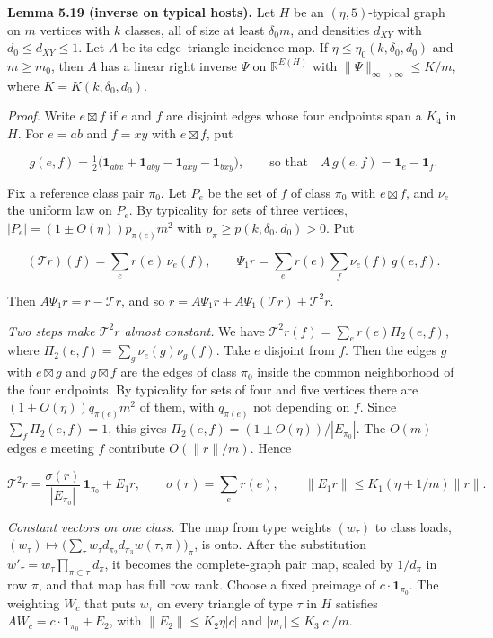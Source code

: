 \documentclass[english,11pt,a4paper]{article}
\begin{document}
\textbf{Lemma 5.19 (inverse on typical hosts).} Let \(H\) be an \((\eta,5)\)-typical graph on \(m\) vertices with \(k\) classes, all of size at least \(\delta_0m\), and densities \(d_{XY}\) with \(d_0\le d_{XY}\le1\). Let \(A\) be its edge--triangle incidence map. If \(\eta\le\eta_0(k,\delta_0,d_0)\) and \(m\ge m_0\), then \(A\) has a linear right inverse \(\Psi\) on \(\mathbb R^{E(H)}\) with \(\|\Psi\|_{\infty\to\infty}\le K/m\), where \(K=K(k,\delta_0,d_0)\).

\emph{Proof.} Write \(e\boxtimes f\) if \(e\) and \(f\) are disjoint edges whose four endpoints span a \(K_4\) in \(H\). For \(e=ab\) and \(f=xy\) with \(e\boxtimes f\), put

\nopagebreak[4]
\[g(e,f)=\tfrac12\bigl(\mathbf 1_{abx}+\mathbf 1_{aby}-\mathbf 1_{axy}-\mathbf 1_{bxy}\bigr),\qquad\text{so that}\quad A\,g(e,f)=\mathbf 1_e-\mathbf 1_f.\]

Fix a reference class pair \(\pi_0\). Let \(P_e\) be the set of \(f\) of class \(\pi_0\) with \(e\boxtimes f\), and \(\nu_e\) the uniform law on \(P_e\). By typicality for sets of three vertices, \(|P_e|=(1\pm O(\eta))p_{\pi(e)}m^2\) with \(p_\pi\ge p(k,\delta_0,d_0)>0\). Put

\nopagebreak[4]
\[(\mathcal Tr)(f)=\sum_e r(e)\,\nu_e(f),\qquad \Psi_1r=\sum_e r(e)\sum_f\nu_e(f)\,g(e,f).\]

Then \(A\Psi_1r=r-\mathcal Tr\), and so \(r=A\Psi_1r+A\Psi_1(\mathcal Tr)+\mathcal T^2r\).

\emph{Two steps make \(\mathcal T^2r\) almost constant.} We have \(\mathcal T^2r(f)=\sum_e r(e)\Pi_2(e,f)\), where \(\Pi_2(e,f)=\sum_g\nu_e(g)\nu_g(f)\). Take \(e\) disjoint from \(f\). Then the edges \(g\) with \(e\boxtimes g\) and \(g\boxtimes f\) are the edges of class \(\pi_0\) inside the common neighborhood of the four endpoints. By typicality for sets of four and five vertices there are \((1\pm O(\eta))q_{\pi(e)}m^2\) of them, with \(q_{\pi(e)}\) not depending on \(f\). Since \(\sum_f\Pi_2(e,f)=1\), this gives \(\Pi_2(e,f)=(1\pm O(\eta))/|E_{\pi_0}|\). The \(O(m)\) edges \(e\) meeting \(f\) contribute \(O(\|r\|/m)\). Hence

\nopagebreak[4]
\[\mathcal T^2r=\frac{\sigma(r)}{|E_{\pi_0}|}\,\mathbf 1_{\pi_0}+E_1r,\qquad \sigma(r)=\sum_e r(e),\qquad \|E_1r\|\le K_1(\eta+1/m)\|r\|.\]

\emph{Constant vectors on one class.} The map from type weights \((w_\tau)\) to class loads, \((w_\tau)\mapsto\bigl(\sum_\tau w_\tau d_{\pi_2}d_{\pi_3}w(\tau,\pi)\bigr)_\pi\), is onto. After the substitution \(w'_\tau=w_\tau\prod_{\pi\subset\tau}d_\pi\), it becomes the complete-graph pair map, scaled by \(1/d_\pi\) in row \(\pi\), and that map has full row rank. Choose a fixed preimage of \(c\cdot\mathbf 1_{\pi_0}\). The weighting \(W_c\) that puts \(w_\tau\) on every triangle of type \(\tau\) in \(H\) satisfies \(AW_c=c\cdot\mathbf 1_{\pi_0}+E_2\), with \(\|E_2\|\le K_2\eta|c|\) and \(|w_\tau|\le K_3|c|/m\).
\end{document}
